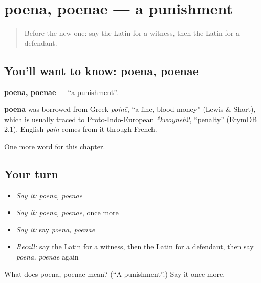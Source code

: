 \section[poena, poenae]{poena, poenae — a punishment}

\label{lesson:LA-C218-poena}



\begin{quote}
Before the new one: say the Latin for a witness, then the Latin for a defendant.
\end{quote}

\subsection*{You'll want to know: poena, poenae}
\textbf{poena, poenae} — \textquotedblleft{}a punishment\textquotedblright{}.

\begin{cousinweb}
\textbf{poena} was borrowed from Greek \emph{poinē}, \textquotedblleft{}a fine, blood-money\textquotedblright{} (Lewis \& Short), which is usually traced to Proto-Indo-European \emph{*kwoyneh2}, \textquotedblleft{}penalty\textquotedblright{} (EtymDB 2.1). English \emph{pain} comes from it through French.
\end{cousinweb}

\begin{grammarlens}[title={What you've built}]
One more word for this chapter.
\end{grammarlens}

\subsection*{Your turn}
\begin{itemize}
\raggedright
  \item \emph{Say it:} \emph{poena, poenae}
  \item \emph{Say it:} \emph{poena, poenae}, once more
  \item \emph{Say it:} say \emph{poena, poenae}
  \item \emph{Recall:} say the Latin for a witness, then the Latin for a defendant, then say \emph{poena, poenae} again
\end{itemize}

\begin{tcolorbox}[breakable,colback=teal!4,colframe=teal!35!black,title={Before you move on}]
What does poena, poenae mean? (\textquotedblleft{}A punishment\textquotedblright{}.) Say it once more.
\end{tcolorbox}

